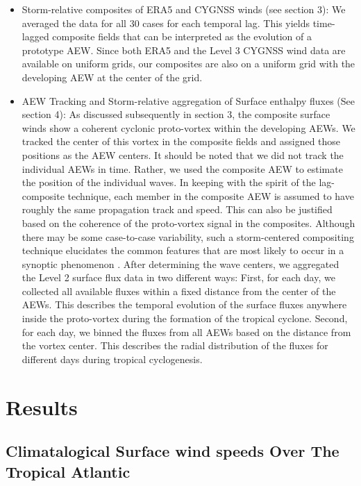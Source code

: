 \documentclass[draft]{agujournal2019}
\begin{document}
\begin{itemize}
    \item Storm-relative composites of ERA5 and CYGNSS winds (see section 3): We averaged the data for all 30 cases for each temporal lag. This yields time-lagged composite fields that can be interpreted as the evolution of a prototype AEW. Since both ERA5 and the Level 3 CYGNSS wind data are available on uniform grids, our composites are also on a uniform grid with the developing AEW at the center of the grid.

    \item AEW Tracking and Storm-relative aggregation of Surface enthalpy fluxes (See section 4): As discussed subsequently in section 3, the composite surface winds show a coherent cyclonic proto-vortex within the developing AEWs. We tracked the center of this vortex in the composite fields and assigned those positions as the AEW centers. It should be noted that we did not track the individual AEWs in time. Rather, we used the composite AEW to estimate the position of the individual waves. In keeping with the spirit of the lag-composite technique, each member in the composite AEW is assumed to have roughly the same propagation track and speed. This can also be justified based on the coherence of the proto-vortex signal in the composites. Although there may be some case-to-case variability, such a storm-centered compositing technique elucidates the common features that are most likely to occur in a synoptic phenomenon \cite{Russell_Aiyyer_2020, WZ2018, Aiyyer2015}. After determining the wave centers, we aggregated the Level 2 surface flux data in two different ways: First, for each day, we collected all available fluxes within a fixed distance from the center of the AEWs. This describes the temporal evolution of the surface fluxes anywhere inside the proto-vortex during the formation of the tropical cyclone. Second, for each day, we binned the fluxes from all AEWs based on the distance from the vortex center. This describes the radial distribution of the fluxes for different days during tropical cyclogenesis.

    
    
\end{itemize}



\section{Results}


\subsection{Climatalogical Surface wind speeds Over The Tropical Atlantic}
\end{document}
